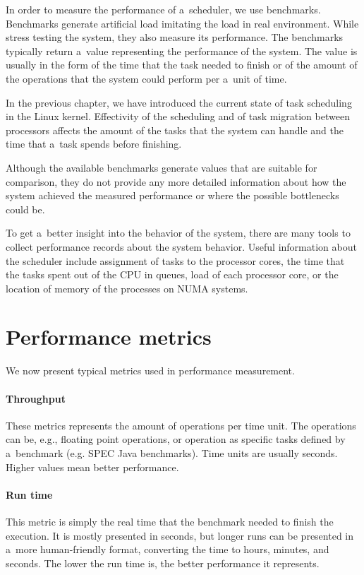 In order to measure the performance of a~scheduler, we use benchmarks.
Benchmarks generate artificial load imitating the load in real environment.
While stress testing the system, they also measure its performance. The benchmarks
typically return a~value representing the performance of the system. The value
is usually in the form of the time that the task needed to finish or of the amount of
the operations that the system could perform per a~unit of time.

In the previous chapter, we have introduced the current state of task scheduling in
the Linux kernel.
Effectivity of the scheduling and of task migration between processors affects
the amount of the tasks that the system can handle and the time that a~task
spends before finishing.

Although the available benchmarks generate values that are suitable for comparison, they
do not provide any more detailed information about how the system achieved the
measured performance or where the possible bottlenecks could
be\;\cite{active-benchmarking}.

To get a~better insight into the behavior of the system, there are many tools to
collect performance records about the system behavior. Useful information about the
scheduler include assignment of tasks to the processor cores, the time that the
tasks spent out of the CPU in queues, load of each processor core, or the
location of memory of the processes on NUMA systems.

\section{Performance metrics} \label{sec:metrics}
We now present typical metrics used in performance measurement.

\paragraph{Throughput} These metrics represents the amount of operations per time
unit. The operations can be, e.g., floating point operations, or operation as
specific tasks defined by a~benchmark (e.g. SPEC Java benchmarks). Time units are usually
seconds. Higher values mean better performance.

\paragraph{Run time} This metric is simply the real time that the benchmark needed to finish the
execution. It is mostly presented in seconds, but longer runs can be presented
in a~more human-friendly format, converting the time to hours, minutes, and seconds. The
lower the run time is, the better performance it represents.


